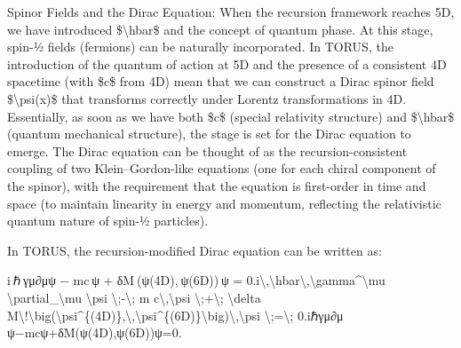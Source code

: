 \documentclass[]{article}
\begin{document}
Spinor Fields and the Dirac Equation: When the recursion framework
reaches 5D, we have introduced \$\textbackslash{}hbar\$ and the concept
of quantum phase. At this stage, spin-½ fields (fermions) can be
naturally incorporated. In TORUS, the introduction of the quantum of
action at 5D and the presence of a consistent 4D spacetime (with \$c\$
from 4D) mean that we can construct a Dirac spinor field
\$\textbackslash{}psi(x)\$ that transforms correctly under Lorentz
transformations in 4D. Essentially, as soon as we have both \$c\$
(special relativity structure) and \$\textbackslash{}hbar\$ (quantum
mechanical structure), the stage is set for the Dirac equation to
emerge. The Dirac equation can be thought of as the recursion-consistent
coupling of two Klein--Gordon-like equations (one for each chiral
component of the spinor), with the requirement that the equation is
first-order in time and space (to maintain linearity in energy and
momentum, reflecting the relativistic quantum nature of spin-½
particles).

In TORUS, the recursion-modified Dirac equation can be written as:

i ℏ γμ∂μψ  −  mc ψ  +  δM ⁣(ψ(4D), ψ(6D)) ψ  =  0.i\textbackslash{},\textbackslash{}hbar\textbackslash{},\textbackslash{}gamma\^{}\textbackslash{}mu
\textbackslash{}partial\_\textbackslash{}mu \textbackslash{}psi
\textbackslash{};-\textbackslash{}; m
c\textbackslash{},\textbackslash{}psi
\textbackslash{};+\textbackslash{}; \textbackslash{}delta
M\textbackslash{}!\textbackslash{}big(\textbackslash{}psi\^{}\{(4D)\},\textbackslash{},\textbackslash{}psi\^{}\{(6D)\}\textbackslash{}big)\textbackslash{},\textbackslash{}psi
\textbackslash{};=\textbackslash{}; 0.iℏγμ∂μ​ψ−mcψ+δM(ψ(4D),ψ(6D))ψ=0.
\end{document}
